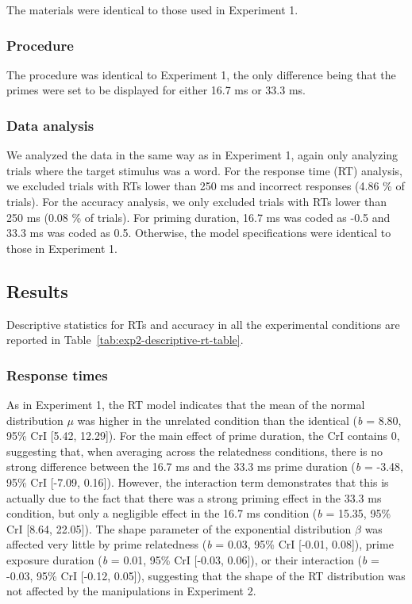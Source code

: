 \documentclass[
  english,
  man,floatsintext]{apa6}
\begin{document}
The materials were identical to those used in Experiment 1.

\hypertarget{procedure-1}{%
\subsubsection{Procedure}\label{procedure-1}}

The procedure was identical to Experiment 1, the only difference being that the primes were set to be displayed for either 16.7 ms or 33.3 ms.

\hypertarget{data-analysis-1}{%
\subsubsection{Data analysis}\label{data-analysis-1}}

We analyzed the data in the same way as in Experiment 1, again only analyzing trials where the target stimulus was a word. For the response time (RT) analysis, we excluded trials with RTs lower than 250 ms and incorrect responses (4.86 \% of trials). For the accuracy analysis, we only excluded trials with RTs lower than 250 ms (0.08 \% of trials). For priming duration, 16.7 ms was coded as -0.5 and 33.3 ms was coded as 0.5. Otherwise, the model specifications were identical to those in Experiment 1.

\hypertarget{results-1}{%
\subsection{Results}\label{results-1}}

Descriptive statistics for RTs and accuracy in all the experimental conditions are reported in Table~\ref{tab:exp2-descriptive-rt-table}.

\hypertarget{response-times-1}{%
\subsubsection{Response times}\label{response-times-1}}

As in Experiment 1, the RT model indicates that the mean of the normal distribution \(\mu\) was higher in the unrelated condition than the identical (\emph{b} = 8.80, 95\% CrI {[}5.42, 12.29{]}). For the main effect of prime duration, the CrI contains 0, suggesting that, when averaging across the relatedness conditions, there is no strong difference between the 16.7 ms and the 33.3 ms prime duration (\emph{b} = -3.48, 95\% CrI {[}-7.09, 0.16{]}). However, the interaction term demonstrates that this is actually due to the fact that there was a strong priming effect in the 33.3 ms condition, but only a negligible effect in the 16.7 ms condition (\emph{b} = 15.35, 95\% CrI {[}8.64, 22.05{]}). The shape parameter of the exponential distribution \(\beta\) was affected very little by prime relatedness (\emph{b} = 0.03, 95\% CrI {[}-0.01, 0.08{]}), prime exposure duration (\emph{b} = 0.01, 95\% CrI {[}-0.03, 0.06{]}), or their interaction (\emph{b} = -0.03, 95\% CrI {[}-0.12, 0.05{]}), suggesting that the shape of the RT distribution was not affected by the manipulations in Experiment 2.
\end{document}
